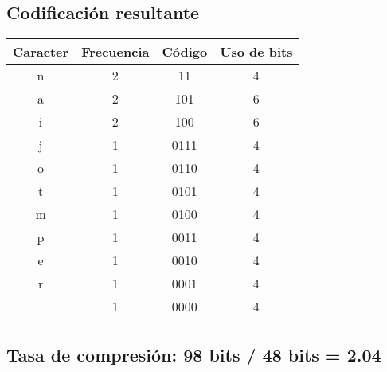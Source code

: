 \documentclass{article}
\begin{document}
\begin{center}
		
		\subsection*{Codificación resultante}
		\begin{tabular}{c|c|c|c}
			\textbf{Caracter} & \textbf{Frecuencia} & \textbf{Código} & \textbf{Uso de bits}\\
			\hline
			n & 2 & 11 & 4\\
			a & 2 & 101 & 6\\
			i & 2 & 100 & 6\\
			j & 1 & 0111 & 4\\
			o & 1 & 0110 & 4\\
			t & 1 & 0101 & 4\\
			m & 1 & 0100 & 4\\  
			p & 1 & 0011 & 4\\
			e & 1 & 0010 & 4\\
			r & 1 & 0001 & 4\\
			  & 1 & 0000 & 4\\
		\end{tabular}
		\subsection*{Tasa de compresión: 98 bits / 48 bits = 2.04}	
	\end{center}
	
\end{document}

